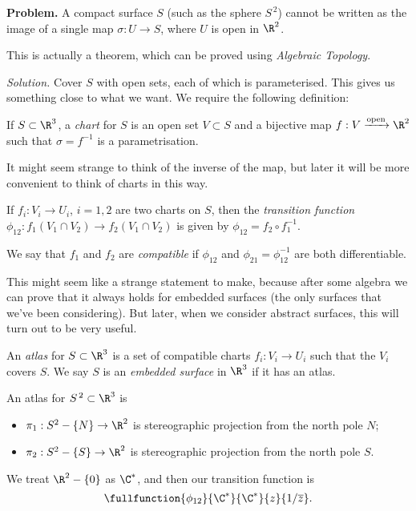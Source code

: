 \textbf{Problem.} A compact surface $S$ (such as the sphere $S^{\,2}$) cannot be written as the image of a single map $\sigma: U\to S$, where $U$ is open in $\R^2$.

This is actually a theorem, which can be proved using \emph{Algebraic Topology}.

\emph{Solution.} Cover $S$ with open sets, each of which is parameterised. This gives us something close to what we want. We require the following definition:

\begin{definition}
	If $S \subset \R^3$, a \emph{chart} for $S$ is an open set $V \subset S$ and a bijective map $f:V \xrightarrow{\text{open}} \R^2$ such that $\sigma = f^{-1}$ is a parametrisation.

	It might seem strange to think of the inverse of the map, but later it will be more convenient to think of charts in this way.

	If $f_i:V_i \to U_i$, $i=1,2$ are two charts on $S$, then the \emph{transition function} $\phi_{12}: f_1(V_1 \cap V_2) \to f_2 (V_1 \cap V_2)$ is given by $\phi_{12} = f_2 \circ f_1^{-1}$.

	We say that $f_1$ and $f_2$ are \emph{compatible} if $\phi_{12}$ and $\phi_{21} = \phi_{12}^{-1}$ are both differentiable.
\end{definition}

This might seem like a strange statement to make, because after some algebra we can prove that it always holds for embedded surfaces (the only surfaces that we've been considering). But later, when we consider abstract surfaces, this will turn out to be very useful.

\begin{definition}
	An \emph{atlas} for $S\subset \R^3$ is a set of compatible charts $f_i: V_i \to U_i$ such that the $V_i$ covers $S$. We say $S$ is an \emph{embedded surface} in $\R^3$ if it has an atlas.
\end{definition}

\begin{example}
	An atlas for $S^{\,2} \subset \R^3$ is
	\begin{itemize}
		\shortskip
		\item $\pi_1:S^2-\{N\} \to \R^2$ is stereographic projection from the north pole $N$;
		\item $\pi_2:S^2-\{S\} \to \R^2$ is stereographic projection from the north pole $S$.
	\end{itemize}
	We treat $\R^2-\{0\}$ as $\C^*$, and then our transition function is
	\begin{equation*}
		\fullfunction{\phi_{12}}{\C^*}{\C^*}{z}{1/\overline{z}}.
	\end{equation*}
\end{example}

